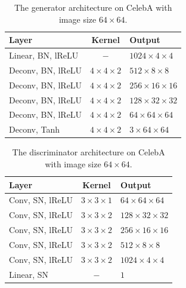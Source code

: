 \documentclass[letterpaper]{article} %
\begin{document}
\begin{table}[H] \centering
	\caption{The generator architecture on CelebA with image size $64 \times 64$.}\label{tab:network_CelebA_G_64}
	\begin{tabular}{lcl}\hline\hline
		Layer              & Kernel           & Output                \\ \hline
		Linear, BN, lReLU  & $-$              & $1024\times4\times4$  \\ \hline
		Deconv, BN, lReLU & $4\times4\times2$ & $512\times8\times8$ \\ \hline
		Deconv, BN, lReLU & $4\times4\times2$ & $256\times16\times16$ \\ \hline
		Deconv, BN, lReLU & $4\times4\times2$ & $128\times32\times32$ \\ \hline
		Deconv, BN, lReLU & $4\times4\times2$ & $64\times64\times64$  \\ \hline
		Deconv, Tanh      & $4\times4\times2$ & $3\times64\times64$ \\ \hline\hline
	\end{tabular}
\end{table}
\begin{table}[H]\centering
	\caption{The discriminator architecture on CelebA with image size $64 \times 64$.}\label{tab:network_CelebA_D_64}
	\begin{tabular}{lcl}\hline\hline
		Layer              & Kernel           & Output           \\ \hline
		Conv, SN, lReLU  & $3\times3\times1$ & $64\times64\times64$  \\ \hline
		Conv, SN, lReLU  & $3\times3\times2$ & $128\times32\times32$ \\ \hline
		Conv, SN, lReLU  & $3\times3\times2$ & $256\times16\times16$ \\ \hline
		Conv, SN, lReLU  & $3\times3\times2$ & $512\times8\times8$ \\ \hline
		Conv, SN, lReLU  & $3\times3\times2$ & $1024\times4\times4$  \\ \hline
		Linear, SN   & $-$               & $1$                   \\ \hline\hline
	\end{tabular}
\end{table}
\end{document}
